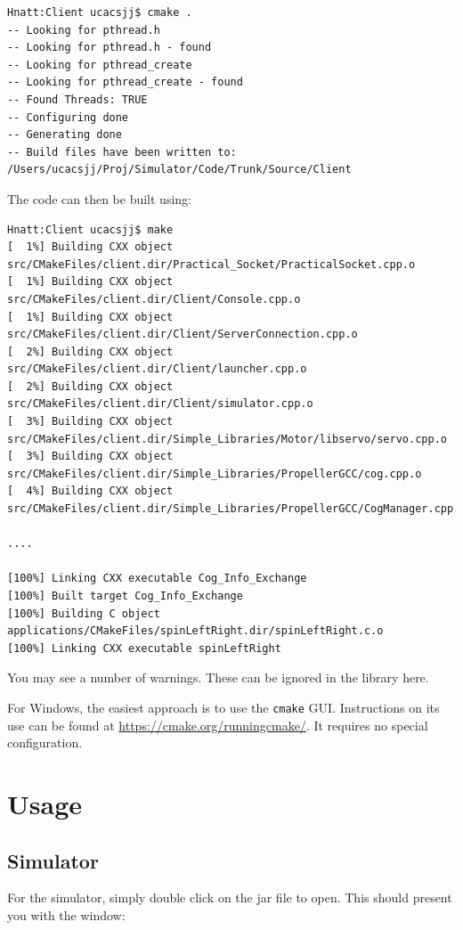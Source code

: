 \documentclass[a4paper]{article}
\begin{document}
\begin{verbatim}
Hnatt:Client ucacsjj$ cmake .
-- Looking for pthread.h
-- Looking for pthread.h - found
-- Looking for pthread_create
-- Looking for pthread_create - found
-- Found Threads: TRUE  
-- Configuring done
-- Generating done
-- Build files have been written to: /Users/ucacsjj/Proj/Simulator/Code/Trunk/Source/Client
\end{verbatim}

The code can then be built using:

\begin{verbatim}
Hnatt:Client ucacsjj$ make
[  1%] Building CXX object src/CMakeFiles/client.dir/Practical_Socket/PracticalSocket.cpp.o
[  1%] Building CXX object src/CMakeFiles/client.dir/Client/Console.cpp.o
[  1%] Building CXX object src/CMakeFiles/client.dir/Client/ServerConnection.cpp.o
[  2%] Building CXX object src/CMakeFiles/client.dir/Client/launcher.cpp.o
[  2%] Building CXX object src/CMakeFiles/client.dir/Client/simulator.cpp.o
[  3%] Building CXX object src/CMakeFiles/client.dir/Simple_Libraries/Motor/libservo/servo.cpp.o
[  3%] Building CXX object src/CMakeFiles/client.dir/Simple_Libraries/PropellerGCC/cog.cpp.o
[  4%] Building CXX object src/CMakeFiles/client.dir/Simple_Libraries/PropellerGCC/CogManager.cpp.o

....

[100%] Linking CXX executable Cog_Info_Exchange
[100%] Built target Cog_Info_Exchange
[100%] Building C object applications/CMakeFiles/spinLeftRight.dir/spinLeftRight.c.o
[100%] Linking CXX executable spinLeftRight

\end{verbatim}

You may see a number of warnings. These can be ignored in the library here.

For Windows, the easiest approach is to use the \verb+cmake+ GUI. Instructions on its use can be found at \url{https://cmake.org/runningcmake/}. It requires no special configuration.

\section*{Usage}

\subsection*{Simulator}

For the simulator, simply double click on the jar file to open. This should present you with the window:
\end{document}
